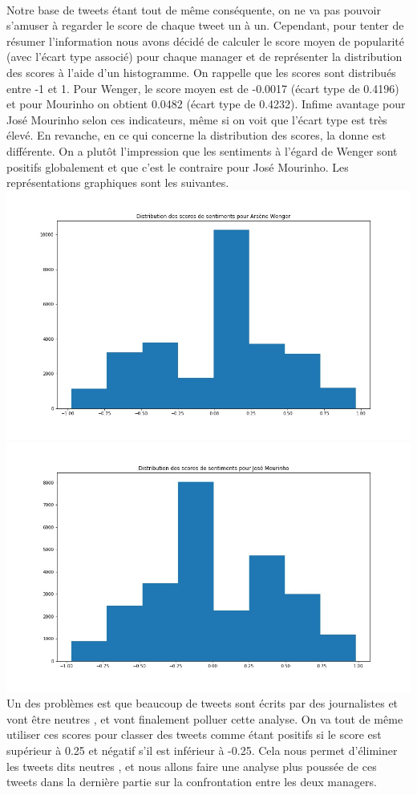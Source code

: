 \documentclass[14pt, openany]{article}
\begin{document}
\paragraph{}
Notre base de tweets étant tout de même conséquente, on ne va pas pouvoir s'amuser à regarder le score de chaque tweet un à un. Cependant, pour tenter de résumer l'information nous avons décidé de calculer le score moyen de popularité (avec l'écart type associé) pour chaque manager et de représenter la distribution des scores à l'aide d'un histogramme. On rappelle que les scores sont distribués entre -1 et 1. Pour Wenger, le score moyen est de -0.0017 (écart type de 0.4196) et pour Mourinho on obtient 0.0482 (écart type de 0.4232). Infime avantage pour José Mourinho selon ces indicateurs, même si on voit que l'écart type est très élevé. En revanche, en ce qui concerne la distribution des scores, la donne est différente. On a plutôt l'impression que les sentiments à l'égard de Wenger sont positifs globalement et que c'est le contraire pour José Mourinho. Les représentations graphiques sont les suivantes.\\
\includegraphics[scale=0.55]{Images/scoresWenger.jpg}
\includegraphics[scale=0.55]{Images/scoresMourinho.jpg}
Un des problèmes est que beaucoup de tweets sont écrits par des journalistes et vont être \og neutres \fg{}, et vont finalement polluer cette analyse. On va tout de même utiliser ces scores pour classer des tweets comme étant positifs si le score est supérieur à 0.25 et négatif s'il est inférieur à -0.25. Cela nous permet d'éliminer les tweets dits \og neutres \fg{}, et nous allons faire une analyse plus poussée de ces tweets dans la dernière partie sur la confrontation entre les deux managers.
\end{document}
